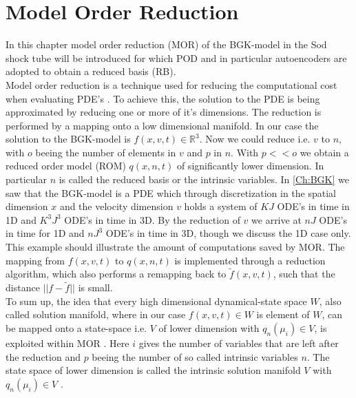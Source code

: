 
\chapter{Model Order Reduction}
\label{Ch:ROM}


In this chapter model order reduction (MOR) of the BGK-model in the Sod shock tube will be introduced for which POD and in particular autoencoders are adopted to obtain a reduced basis (RB).\\
Model order reduction is a technique used for reducing the computational cost when evaluating PDE's \cite{Bernard}\cite{Carlberg}\cite{ohlberger2015reduced}. To achieve this, the solution to the PDE is being approximated by reducing one or more of it's dimensions. The reduction is performed by a mapping onto a low dimensional manifold. In our case the solution to the BGK-model is \(f(x,v,t) \in \mathbb{R}^3\). Now we could reduce i.e. \(v\) to \(n\), with \(o\) beeing the number of elements in \(v\) and \(p\) in \(n\). With \(p << o\) we obtain a reduced order model (ROM) \(q(x,n,t)\) of significantly lower dimension. In particular \(n\) is called the reduced basis or the intrinsic variables. In \cref{Ch:BGK} we saw that the BGK-model is a PDE which through discretization in the spatial dimension \(x\) and the velocity dimension \(v\) holds a system of \(KJ\) ODE's in time in 1D and \(K^3J^3\) ODE's in time in 3D.  By the reduction of \(v\) we arrive at \(nJ\) ODE's in time for 1D and \(nJ^3\) ODE's in time in 3D, though we discuss the 1D case only. This example should illustrate the amount of computations saved by MOR. The mapping from \(f(x,v,t)\) to \(q(x,n,t)\) is implemented through a reduction algorithm, which also performs a remapping back to \(\tilde{f}(x,v,t)\), such that the distance \(||f - \tilde{f}||\) is small.\\
To sum up, the idea that every high dimensional dynamical-state space \(W\), also called solution manifold, where in our case \(f(x,v,t) \in W\) is element of \(W\), can be mapped onto a state-space i.e. \(V\) of lower dimension with \(q_n(\mu_i) \in V\), is exploited within MOR \cite{ohlberger2015reduced}. Here \(i\) gives the number of variables that are left after the reduction and \(p\) beeing the number of so called intrinsic variables \(n\). The state space of lower dimension is called the intrinsic solution manifold \(V\) with \(q_n(\mu_i) \in V\) \cite{Carlberg}.\\
